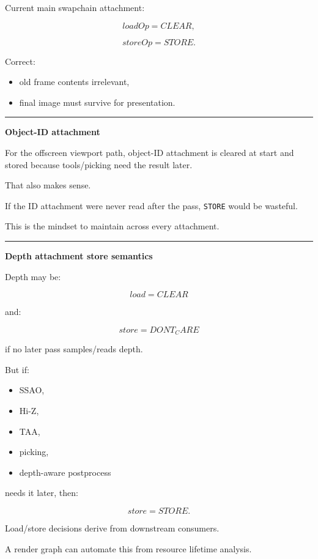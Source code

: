 Current main swapchain attachment:

\[
loadOp=CLEAR,
\]

\[
storeOp=STORE.
\]

Correct:

\begin{itemize}
\tightlist
\item
  old frame contents irrelevant,
\item
  final image must survive for presentation.
\end{itemize}

\begin{center}\rule{0.5\linewidth}{0.5pt}\end{center}

\textbf{Object-ID attachment}

For the offscreen viewport path, object-ID attachment is cleared at start and stored because tools/picking need the result later.

That also makes sense.

If the ID attachment were never read after the pass, \texttt{STORE} would be wasteful.

This is the mindset to maintain across every attachment.

\begin{center}\rule{0.5\linewidth}{0.5pt}\end{center}

\textbf{Depth attachment store semantics}

Depth may be:

\[
load=CLEAR
\]

and:

\[
store=DONT_CARE
\]

if no later pass samples/reads depth.

But if:

\begin{itemize}
\tightlist
\item
  SSAO,
\item
  Hi-Z,
\item
  TAA,
\item
  picking,
\item
  depth-aware postprocess
\end{itemize}

needs it later, then:

\[
store=STORE.
\]

Load/store decisions derive from downstream consumers.

A render graph can automate this from resource lifetime analysis.

